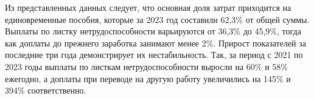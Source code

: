 
Из представленных данных следует, что основная доля затрат приходится на
единовременные пособия, которые за 2023 год составили 62,3\% от общей
суммы. Выплаты по листку нетрудоспособности варьируются от 36,3\% до
45,9\%, тогда как доплаты до прежнего заработка занимают менее 2\%.
Прирост показателей за последние три года демонстрирует их
нестабильность. Так, за период с 2021 по 2023 годы выплаты по листкам
нетрудоспособности выросли на 60\% и 58\% ежегодно, а доплаты при
переводе на другую работу увеличились на 145\% и 394\% соответственно.

